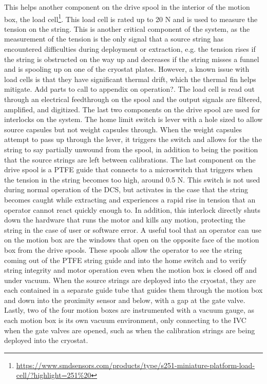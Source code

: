 This helps another component on the drive spool in the interior of the motion box, the load cell\footnote{\url{https://www.smdsensors.com/products/type/s251-miniature-platform-load-cell/?highlight=251\%20}}.
This load cell is rated up to 20 N and is used to measure the tension on the string.
This is another critical component of the system, as the measurement of the tension is the only signal that a source string has encountered difficulties during deployment or extraction, e.g. the tension rises if the string is obstructed on the way up and decreases if the string misses a funnel and is spooling up on one of the cryostat plates.
However, a known issue with load cells is that they have significant thermal drift, which the thermal fin helps mitigate.
\color{red} Add parts to call to appendix on operation?\color{black}.
The load cell is read out through an electrical feedthrough on the spool and the output signals are filtered, amplified, and digitized.
The last two components on the drive spool are used for interlocks on the system.
The home limit switch is lever with a hole sized to allow source capsules but not weight capsules through.
When the weight capsules attempt to pass up through the lever, it triggers the switch and allows for the the string to say partially unwound from the spool, in addition to being the position that the source strings are left between calibrations.
The last component on the drive spool is a PTFE guide that connects to a microswitch that triggers when the tension in the string becomes too high, around 0.5 N.
This switch is not used during normal operation of the DCS, but activates in the case that the string becomes caught while extracting and experiences a rapid rise in tension that an operator cannot react quickly enough to.
In addition, this interlock directly shuts down the hardware that runs the motor and kills any motion, protecting the string in the case of user or software error.
A useful tool that an operator can use on the motion box are the windows that open on the opposite face of the motion box from the drive spools. These spools allow the operator to see the string coming out of the PTFE string guide and into the home switch and to verify string integrity and motor operation even when the motion box is closed off and under vacuum.
When the source strings are deployed into the cryostat, they are each contained in a separate guide tube that guides them through the motion box and down into the proximity sensor and below, with a gap at the gate valve.
Lastly, two of the four motion boxes are instrumented with a vacuum gauge, as each motion box is its own vacuum environment, only connecting to the IVC when the gate valves are opened, such as when the calibration strings are being deployed into the cryostat.
